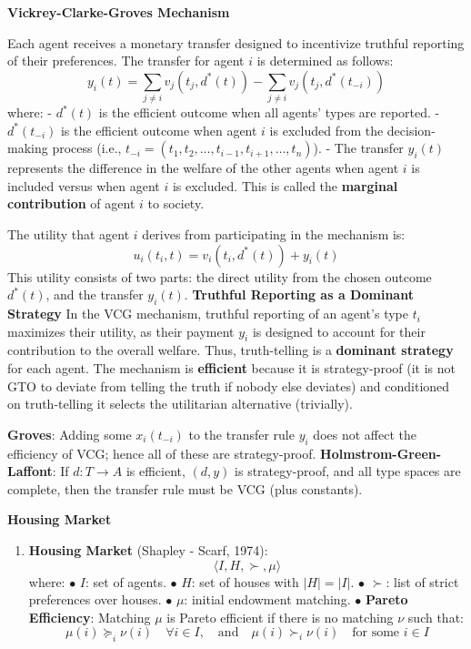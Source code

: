 \documentclass[8pt]{scrartcl}
\newcommand{\vocab}[1]{\textbf{\color{blue} #1}}
\renewcommand{\section}[1]{\begin{center}\textbf{\color{red}#1}\end{center}}
\begin{document}
\begin{multicols*}{2}
    \section{Vickrey-Clarke-Groves Mechanism}
        Each agent receives a monetary transfer designed to incentivize truthful reporting of their preferences. The transfer for agent \( i \) is determined as follows:
        \[
        y_i(t) = \sum_{j \neq i} v_j(t_j, d^*(t)) - \sum_{j \neq i} v_j(t_j, d^*(t_{-i}))
        \]
        where:
        - \( d^*(t) \) is the efficient outcome when all agents' types are reported.
        - \( d^*(t_{-i}) \) is the efficient outcome when agent \( i \) is excluded from the decision-making process (i.e., \( t_{-i} = (t_1, t_2, \dots, t_{i-1}, t_{i+1}, \dots, t_n) \)).
        - The transfer \( y_i(t) \) represents the difference in the welfare of the other agents when agent \( i \) is included versus when agent \( i \) is excluded. This is called the \vocab{marginal contribution} of agent \( i \) to society.

        The utility that agent \( i \) derives from participating in the mechanism is:
        \[
        u_i(t_i, t) = v_i(t_i, d^*(t)) + y_i(t)
        \]
        This utility consists of two parts: the direct utility from the chosen outcome \( d^*(t) \), and the transfer \( y_i(t) \).
\vocab{Truthful Reporting as a Dominant Strategy}
    In the VCG mechanism, truthful reporting of an agent's type \( t_i \) maximizes their utility, as their payment \( y_i \) is designed to account for their contribution to the overall welfare. Thus, truth-telling is a \vocab{dominant strategy} for each agent.
    The mechanism is \vocab{efficient} because it is strategy-proof (it is not GTO
    to deviate from telling the truth if nobody else deviates) and conditioned on
    truth-telling it selects the utilitarian alternative (trivially).

    \vocab{Groves}: Adding some $x_i(t_{-i})$ to the transfer rule $y_i$ does not
    affect the efficiency of VCG; hence all of these are strategy-proof.
    \vocab{Holmstrom-Green-Laffont}: If $d:T\to A$ is efficient, $(d,y)$ is
    strategy-proof, and all type spaces are complete, then the transfer rule must be
    VCG (plus constants).

    \section{Housing Market}
    \begin{enumerate}
        \item \vocab{Housing Market} (Shapley - Scarf, 1974):
        \[
        \langle I, H, \succ, \mu \rangle
        \]
        where:
        $\bullet$ \( I \): set of agents.
        $\bullet$ \( H \): set of houses with \( |H| = |I| \).
        $\bullet$ \( \succ \): list of strict preferences over houses.
        $\bullet$ \( \mu \): initial endowment matching.
        $\bullet$ \vocab{Pareto Efficiency}: Matching \( \mu \) is Pareto efficient if there is no matching \( \nu \) such that:
        \[
        \mu(i) \succeq_i \nu(i) \quad \forall i \in I, \quad \text{and} \quad \mu(i) \succ_i \nu(i) \quad \text{for some } i \in I
        \]
        

\end{enumerate}
\end{multicols*}
\end{document}
